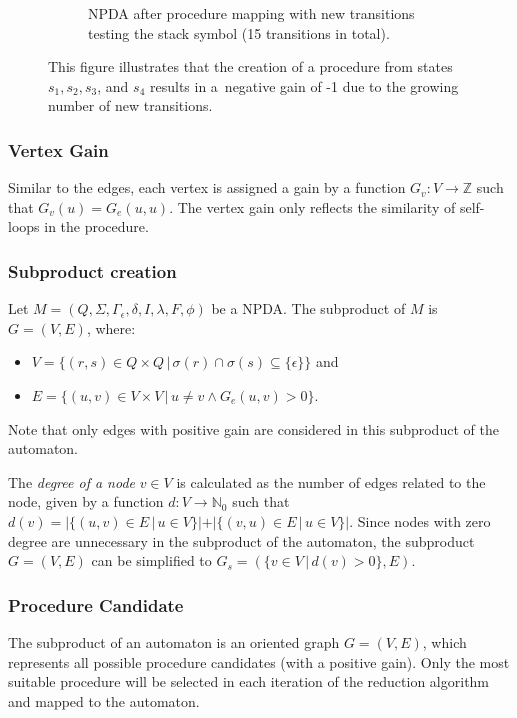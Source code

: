 \begin{figure}[!h]
\begin{subfigure}[b]{0.485\textwidth}
\begin{tikzpicture}[node distance=1.7cm, every node/.style={font=\footnotesize}]
                        \end{tikzpicture}
                    \caption*{NPDA after procedure mapping with new transitions testing the stack symbol (15 transitions in total).}
                \end{subfigure}
                \vspace*{1em}
                \caption{This figure illustrates that the creation of a procedure from states $s_1, s_2, s_3$, and $s_4$ results in a~negative gain of -1 due to the growing number of new transitions.}
                \label{fig:trans_resonstruction}
            \end{figure}

        \subsubsection*{Vertex Gain}
            Similar to the edges, each vertex is assigned a gain by a function $G_v: V \rightarrow \mathbb{Z}$ such that $G_v(u) = G_e(u, u)$. The vertex gain only reflects the similarity of self-loops in the procedure.

        \subsubsection*{Subproduct creation}
            Let $M = (Q, \Sigma, \Gamma_\epsilon, \delta, I, \lambda, F, \phi)$ be a NPDA. The subproduct of $M$ is $G = (V, E)$, where:
            \begin{itemize}
                \item $V = \{(r, s) \in Q \times Q\,|\, \sigma(r) \cap \sigma(s) \subseteq \{\epsilon\}\}$ and
                \item $E = \{(u, v) \in V \times V\,|\, u \neq v \land G_e(u, v) > 0\}$.
            \end{itemize}
            Note that only edges with positive gain are considered in this subproduct of the automaton.

            The \textit{degree of a node} $v \in V$ is calculated as the number of edges related to the node, given by a function $d: V \rightarrow \mathbb{N}_0$ such that $d(v) = |\{(u, v) \in E\,|\, u \in V\}| + |\{(v, u) \in E\,|\, u \in V\}|$. Since nodes with zero degree are unnecessary in the subproduct of the automaton, the subproduct $G = (V, E)$ can be simplified to $G_s = (\{v \in V\,|\, d(v) > 0\}, E)$.

        \subsubsection*{Procedure Candidate}
            The subproduct of an automaton is an oriented graph $G = (V, E)$, which represents all possible procedure candidates (with a positive gain). Only the most suitable procedure will be selected in each iteration of the reduction algorithm and mapped to the automaton.


